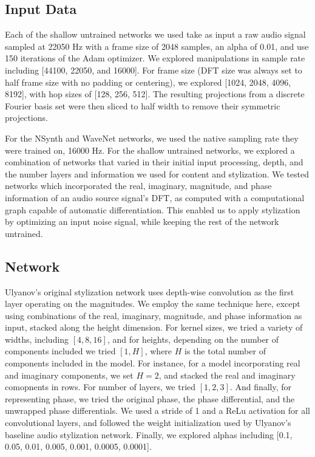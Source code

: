 \documentclass{article}
\begin{document}
\subsection{Input Data}

Each of the shallow untrained networks we used take as input a raw audio signal sampled at 22050 Hz with a frame size of 2048 samples, an alpha of 0.01, and use 150 iterations of the Adam optimizer.  We explored manipulations in sample rate including [44100, 22050, and 16000].  For frame size (DFT size was always set to half frame size with no padding or centering), we explored [1024, 2048, 4096, 8192], with hop sizes of [128, 256, 512].  The resulting projections from a discrete Fourier basis set were then sliced to half width to remove their symmetric projections.

For the NSynth and WaveNet networks, we used the native sampling rate they were trained on, 16000 Hz.  For the shallow untrained networks, we explored a combination of networks that varied in their initial input processing, depth, and the number layers and information we used for content and stylization.  We tested networks which incorporated the real, imaginary, magnitude, and phase information of an audio source signal's DFT, as computed with a computational graph capable of automatic differentiation.  This enabled us to apply stylization by optimizing an input noise signal, while keeping the rest of the network untrained.

\subsection{Network}

Ulyanov's original stylization network uses depth-wise convolution as the first layer operating on the magnitudes.  We employ the same technique here, except using combinations of the real, imaginary, magnitude, and phase information as input, stacked along the height dimension.  For kernel sizes, we tried a variety of widths, including ${[4, 8, 16]}$, and for heights, depending on the number of components included we tried ${[1, H]}$, where $H$ is the total number of components included in the model.  For instance, for a model incorporating real and imaginary components, we set $H = 2$, and stacked the real and imaginary comopnents in rows. For number of layers, we tried ${[1, 2, 3]}$.  And finally, for representing phase, we tried the original phase, the phase differential, and the unwrapped phase differentials.  We used a stride of 1 and a ReLu activation for all convolutional layers, and followed the weight initialization used by Ulyanov's baseline audio stylization network.  Finally, we explored alphas including [0.1, 0.05, 0.01, 0.005, 0.001, 0.0005, 0.0001].
\end{document}
